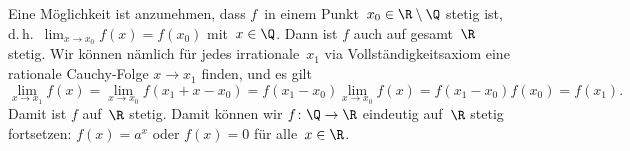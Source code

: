 \documentclass[a4paper]{article}
\begin{document}
Eine Möglichkeit ist anzunehmen, dass $f$~in einem Punkt~$x_0 \in \R\setminus\Q$ stetig ist, d.\,h.\ $\lim_{x\to x_0} f(x) = f(x_0)$ mit~$x \in \Q$. Dann ist $f$ auch auf gesamt~$\R$ stetig. Wir können nämlich für jedes irrationale~$x_1$ via Vollständigkeitsaxiom eine rationale Cauchy-Folge $x \to x_1$ finden, und es gilt
\begin{equation*}
    \lim_{x\to x_1} f(x) = \lim_{x\to x_0} f(x_1+x-x_0) = f(x_1-x_0) \lim_{x\to x_0} f(x) = f(x_1-x_0)f(x_0) = f(x_1).
\end{equation*}
Damit ist $f$ auf~$\R$ stetig. Damit können wir $f\colon \Q \to \R$ eindeutig auf~$\R$ stetig fortsetzen: $f(x) = a^x$ oder $f(x) = 0$ für alle~$x \in \R$.
\end{document}
